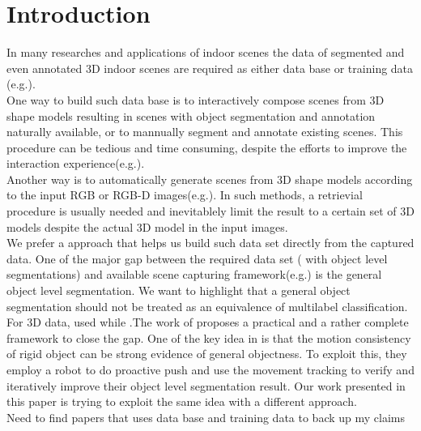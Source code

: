 \section{Introduction}
\label{sec:intro}
In many researches and applications of indoor scenes the data of segmented and even annotated 3D indoor scenes are required as either data base or training data (e.g.\cite{SceneFromExample}\cite{Fisher:2012:ESO:2366145.2366154}\cite{Chen:2014:ASM:2661229.2661239}\cite{Fisher:ActivityCentricSceneSynthesis}).\\
One way to build such data base is to interactively compose scenes from 3D shape models resulting in scenes with object segmentation and annotation naturally available, or to mannually segment and annotate existing scenes. This procedure can be tedious and time consuming, despite the efforts to improve the interaction experience(e.g.\cite{Merrell:2011:IFL:2010324.1964982}\cite{Xu:2013:SSC:2461912.2461968}).\\
Another way is to automatically generate scenes from 3D shape models according to the input RGB or RGB-D images(e.g.\cite{Liu2015Model}\cite{Chen:2014:ASM:2661229.2661239}). In such methods, a retrievial procedure is usually needed and inevitablely limit the result to a certain set of 3D models despite the actual 3D model in the input images.\\
We prefer a approach that helps us build such data set directly from the captured data. One of the major gap between the required data set ( with object level segmentations) and available scene capturing framework(e.g.\cite{KinectFusion}) is the general object level segmentation. We want to highlight that a general object segmentation should not be treated as an equivalence of multilabel classification. For 3D data, \cite{3DReasoningfromBlockstoStability} used  while .The work of \cite{Xu:2015:ACS:2816795.2818075} proposes a practical and a rather complete framework to close the gap. One of the key idea in \cite{Xu:2015:ACS:2816795.2818075} is that the motion consistency of rigid object can be strong evidence of general objectness. To exploit this, they employ a robot to do proactive push and use the movement tracking to verify and iteratively improve their object level segmentation result. Our work presented in this paper is trying to exploit the same idea with a different approach.\\
      
{\color{blue}Need to find papers that uses data base and training data to back up my claims} 